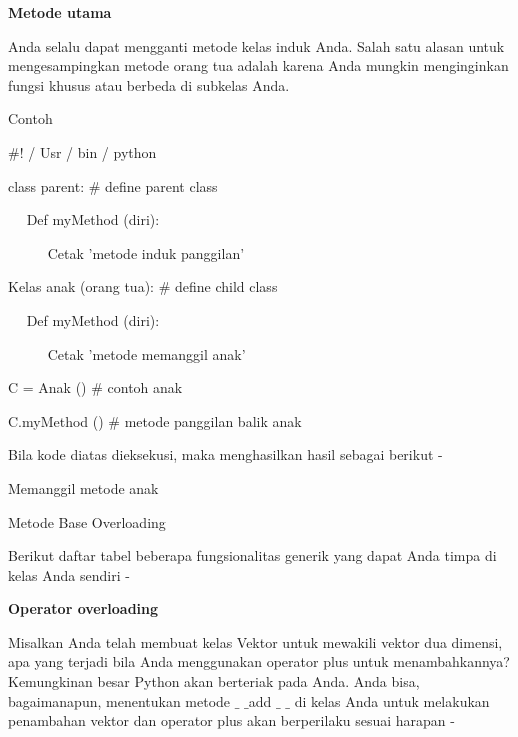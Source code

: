 \vspace{12pt}
\noindent 
{\fontsize{14pt}{14pt}\selectfont \textbf{Metode utama} \\} \par
\vspace{12pt}
Anda selalu dapat mengganti metode kelas induk Anda. Salah satu alasan untuk mengesampingkan metode orang tua adalah karena Anda mungkin menginginkan fungsi khusus atau berbeda di subkelas Anda. \par
Contoh \par
\vspace{12pt}
\noindent 
 $  \#  $! / Usr / bin / python \par
\vspace{12pt}
\noindent 
class parent:  $  \#  $ define parent class \par
\noindent 
~~ Def myMethod (diri): \par
\noindent 
~~~~~ Cetak 'metode induk panggilan' \par
\vspace{12pt}
\noindent 
Kelas anak (orang tua):  $  \#  $ define child class \par
\noindent 
~~ Def myMethod (diri): \par
\noindent 
~~~~~ Cetak 'metode memanggil anak' \par
\vspace{12pt}
\noindent 
C = Anak ()  $  \#  $ contoh anak \par
\noindent 
C.myMethod ()  $  \#  $ metode panggilan balik anak \par
\vspace{12pt}
\noindent 
Bila kode diatas dieksekusi, maka menghasilkan hasil sebagai berikut - \par
\vspace{12pt}
\noindent 
Memanggil metode anak \par
\vspace{12pt}
\noindent 
Metode Base Overloading \par
\vspace{12pt}
\noindent 
Berikut daftar tabel beberapa fungsionalitas generik yang dapat Anda timpa di kelas Anda sendiri - \par
\vspace{14pt}
\noindent 
{\fontsize{14pt}{14pt}\selectfont \textbf{Operator overloading} \\} \par
\vspace{12pt}
Misalkan Anda telah membuat kelas Vektor untuk mewakili vektor dua dimensi, apa yang terjadi bila Anda menggunakan operator plus untuk menambahkannya? Kemungkinan besar Python akan berteriak pada Anda. Anda bisa, bagaimanapun, menentukan metode  $  \_  $ $  \_  $add $  \_  $ $  \_  $ di kelas Anda untuk melakukan penambahan vektor dan operator plus akan berperilaku sesuai harapan - \par

